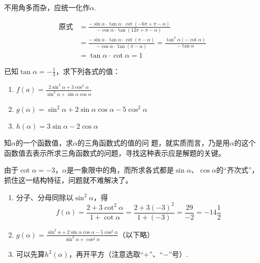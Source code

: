 \begin{analyze}
不用角多而杂，应统一化作$\alpha$.
\end{analyze}

\begin{solution}
\[\begin{split}
\text{原式}&=\frac{-\sin\alpha \cdot \tan\alpha\cdot \cot(-6\pi+\pi-\alpha)}{-\cos\alpha\cdot \tan(12\pi+\pi-\alpha)}\\
&=\frac{-\sin\alpha \cdot \tan\alpha\cdot \cot (\pi-\alpha)}{-\cos\alpha\cdot \tan(\pi-\alpha)}=\frac{\tan^2\alpha (-\cot\alpha)}{-\tan\alpha}\\
&=\tan\alpha\cdot \cot\alpha =1
\end{split}\]
\end{solution}

\begin{example}
已知$\tan\alpha=-\frac{1}{3}$，求下列各式的值：
\begin{multicols}{2}
\begin{enumerate}[(1)]
    \item $f(a)=\frac{2\sin^2\alpha+3\cos^2\alpha}{\sin^2\alpha+\sin\alpha\cos\alpha}$
    \item $g(\alpha)=\sin^2\alpha+2\sin\alpha\cos\alpha-5\cos^2\alpha$
    \item $h(\alpha)=3\sin\alpha-2\cos\alpha$
\end{enumerate}
\end{multicols}
\end{example}

\begin{analyze}
知$\alpha$的一个函数值，求$\alpha$的三角函数式的值的问
    题，就实质而言，乃是用$\alpha$的这个函数值去表示所求三角函数式的问题，寻找这种表示应是解题的关键。

    由于$\cot\alpha=-3$，$\alpha$是一象限中的角，而所求各式都是$\sin\alpha$、$\cos\alpha$的“齐次式”，抓住这一结构特征，问题就不难解决了。

\begin{enumerate}[(1)]
    \item    分子、分母同除以$\sin^2\alpha$，得
\[f(\alpha)=\frac{2+3\cot^2\alpha}{1+\cot\alpha}=\frac{2+3(-3)^2}{1+(-3)}=\frac{29}{-2}=-14\frac{1}{2}\]
\item $g(\alpha)=\frac{\sin^2\alpha+2\sin\alpha\cos\alpha-5\cos^2\alpha}{\sin^2\alpha+\cos^2\alpha}$（以下略）
\item 可以先算$h^2(\alpha)$，再开平方（注意选取“$+$”、“$-$”号）.
\end{enumerate}
\end{analyze}

